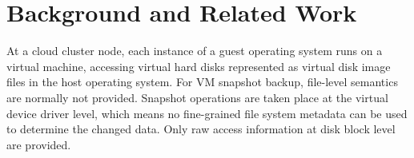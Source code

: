 
\section{Background and Related Work}
\label{sect:background}




At a cloud cluster node, each instance of a guest operating system runs on a virtual machine, accessing virtual hard disks 
represented as virtual disk image files in the host operating system.
For VM snapshot backup, file-level semantics are normally not provided.
Snapshot operations are taken place at the virtual device driver level, which means no fine-grained file system metadata can be used to determine the changed data. Only raw access information at disk block level are provided. 


